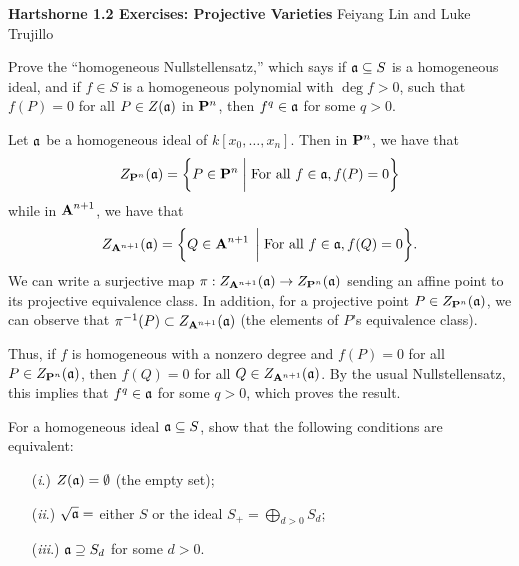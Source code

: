 \documentclass[10pt]{amsart}
\newcommand{\header}[2]{
    {\noindent
    {\Large \bf Hartshorne #1 Exercises: #2}
    \hfill 
    {\large Feiyang Lin and Luke Trujillo}
    \vspace{0.5cm}}
}
\begin{document}
\header{1.2}{Projective Varieties}

\begin{exercise}[2.1]
    Prove the ``homogeneous Nullstellensatz,'' which says if $\fa
    \subseteq S$ is a homogeneous ideal, and if $f \in S$ is a homogeneous
    polynomial with $\deg f > 0$, such that $f(P) = 0$ for all $P \in
    Z(\fa)$ in $\bbP^n$, then $f^q \in \fa$ for some $q >
    0$.
\end{exercise}

\begin{solution}
    \begin{luke}
    Let $\idl{a}$ be a homogeneous ideal of $k[x_0, \dots, x_n]$. 
    Then in $\bbP^n$, we have that  
    \[
        Z_{\pp^n}(\idl{a}) = \bigg\{ P \in \bbP^n \;\bigg|\; \text{For all } f \in \idl{a}, f(P) = 0  \bigg\}
    \]
    while in $\aa^{n+1}$, we have that 
    \[
        Z_{\aa^{n+1}}(\idl{a}) = \bigg\{ Q \in \aa^{n+1} \;\bigg|\; \text{For all } f \in \idl{a}, f(Q) = 0  \bigg\}.
    \]
    We can write a surjective map $\pi: Z_{\aa^{n+1}}(\idl{a}) \to Z_{\pp^n}(\idl{a})$ sending an affine point to its projective 
    equivalence class.
    In addition, for a projective point $P \in Z_{\pp^n}(\idl{a})$, we can observe that 
    $\pi^{-1}(P) \subset Z_{\aa^{n+1}}(\idl{a})$ (the elements of $P$'s equivalence class). 
    
    Thus, if $f$ is homogeneous with a nonzero degree and $f(P) = 0$ for all $P \in Z_{\pp^n}(\idl{a})$, 
    then $f(Q) = 0$ for all $Q \in Z_{\aa^{n+1}}(\idl{a})$. By the usual Nullstellensatz, 
    this implies that $f^q \in \idl{a}$ for some $q > 0$, which proves the result. 
    \end{luke}
\end{solution}

\begin{exercise}[2.2]
    For a homogeneous ideal $\fa \subseteq S$, show that the following
    conditions are equivalent:
    \begin{itemize}
        \item[(\emph{i}.)] $Z(\fa) = \emptyset$ (the empty set);
        \item[(\emph{ii}.)] $\sqrt{\fa} =$ either $S$ or the ideal $S_+ =
        \bigoplus_{d > 0}S_d$;
        \item[(\emph{iii}.)] $\fa \supseteq S_d$ for some $d > 0$. 
    \end{itemize}
\end{exercise}
\end{document}
